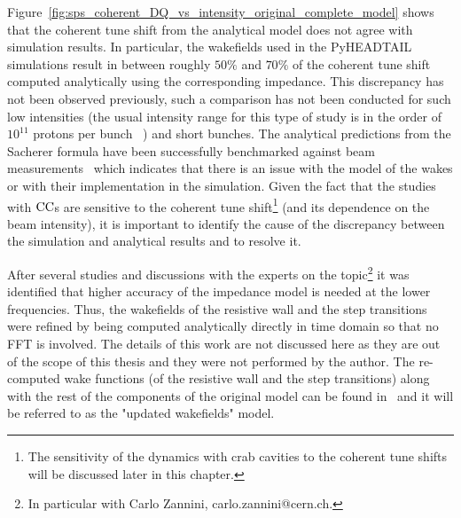 Figure~\ref{fig:sps_coherent_DQ_vs_intensity_original_complete_model} shows that the coherent tune shift from the analytical model does not agree with simulation results. In particular, the wakefields used in the PyHEADTAIL simulations result in between roughly $50\%$ and $70\%$ of the coherent tune shift computed analytically using the corresponding impedance. This discrepancy has not been observed previously, such a comparison has not been conducted for such low intensities (the usual intensity range for this type of study is in the order of $10^{11}$ protons per bunch ~\cite{Beck:2683038}) and short bunches. %
The analytical predictions from the Sacherer formula have been successfully benchmarked against beam measurements~\cite{Bartosik:1742183, sps_impedance_measurements_vs_model} which indicates that there is an issue with the model of the wakes or with their implementation in the simulation. Given the fact that the studies with ${\mathrm{CC}}$s are sensitive to the coherent tune shift\footnote{The sensitivity of the dynamics with crab cavities to the coherent tune shifts will be discussed later in this chapter.} (and its dependence on the beam intensity), it is important to identify the cause of the discrepancy between the simulation and analytical results and to resolve it.

 After several studies and discussions with the experts on the topic\footnote{In particular with Carlo Zannini, carlo.zannini@cern.ch.} it was identified that higher accuracy of the impedance model is needed at the lower frequencies. Thus, the wakefields of the resistive wall and the step transitions were refined by being computed analytically directly in time domain so that no FFT is involved. %
The details of this work are not discussed here as they are out of the scope of this thesis and they were not performed by the author. The re-computed wake functions (of the resistive wall and the step transitions) along with the rest of the components of the original model can be found in~\cite{updated_sps_wakfields_model} and it will be referred to as the "updated wakefields" model.

